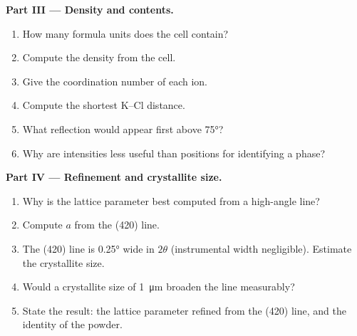 \begin{problem}
\medskip\noindent\textbf{Part III --- Density and contents.}
\begin{enumerate}[resume]
  \item How many formula units does the cell contain?
  \item Compute the density from the cell.
  \item Give the coordination number of each ion.
  \item Compute the shortest K--Cl distance.
  \item What reflection would appear first above \ang{75}?
  \item Why are intensities less useful than positions for identifying a phase?
\end{enumerate}

\medskip\noindent\textbf{Part IV --- Refinement and crystallite size.}
\begin{enumerate}[resume]
  \item Why is the lattice parameter best computed from a high-angle line?
  \item Compute $a$ from the (420) line.
  \item The (420) line is \ang{0.25} wide in $2\theta$ (instrumental width
        negligible). Estimate the crystallite size.
  \item Would a crystallite size of \qty{1}{\micro m} broaden the line measurably?
  \item State the result: the lattice parameter refined from the (420) line, and
        the identity of the powder.
\end{enumerate}
\end{problem}

